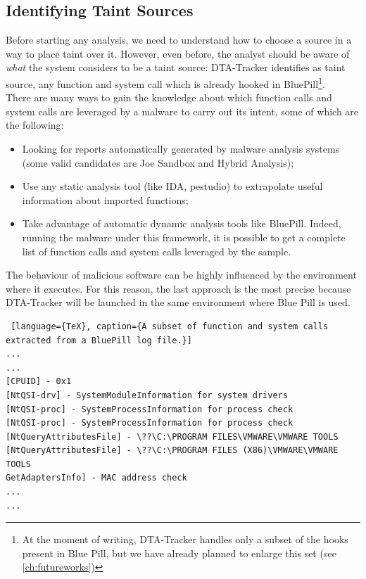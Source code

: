 \documentclass[LaM,binding=0.6cm]{sapthesis}
\begin{document}
\subsection{Identifying Taint Sources}
\label{subsec:identifyingtaintsources}
Before starting any analysis, we need to understand how to choose a source in a way to place taint over it. However, even before, the analyst should be aware of \textit{what} the system considers to be a taint source: DTA-Tracker identifies as taint source, any function and system call which is already hooked in BluePill\footnote{At the moment of writing, DTA-Tracker handles only a subset of the hooks present in Blue Pill, but we have already planned to enlarge this set (see \autoref{ch:futureworks})}.\\

There are many ways to gain the knowledge about which function calls and system calls are leveraged by a malware to carry out its intent, some of which are the following:
\begin{itemize}
\item Looking for reports automatically generated by malware analysis systems (some valid candidates are Joe Sandbox and Hybrid Analysis);
\item Use any static analysis tool (like IDA, pestudio) to extrapolate useful information about imported functions;
\item Take advantage of automatic dynamic analysis tools like BluePill. Indeed, running the malware under this framework, it is possible to get a complete list of function calls and system calls leveraged by the sample. 
\end{itemize}
The behaviour of malicious software can be highly influenced by the environment where it executes. For this reason, the last approach is the most precise because DTA-Tracker will be launched in the same environment where Blue Pill is used.
\begin{lstlisting} [language={TeX}, caption={A subset of function and system calls extracted from a BluePill log file.}]
...
...
[CPUID] - 0x1
[NtQSI-drv] - SystemModuleInformation for system drivers
[NtQSI-proc] - SystemProcessInformation for process check
[NtQSI-proc] - SystemProcessInformation for process check
[NtQueryAttributesFile] - \??\C:\PROGRAM FILES\VMWARE\VMWARE TOOLS
[NtQueryAttributesFile] - \??\C:\PROGRAM FILES (X86)\VMWARE\VMWARE TOOLS
GetAdaptersInfo] - MAC address check
...
...
\end{lstlisting}
\end{document}
